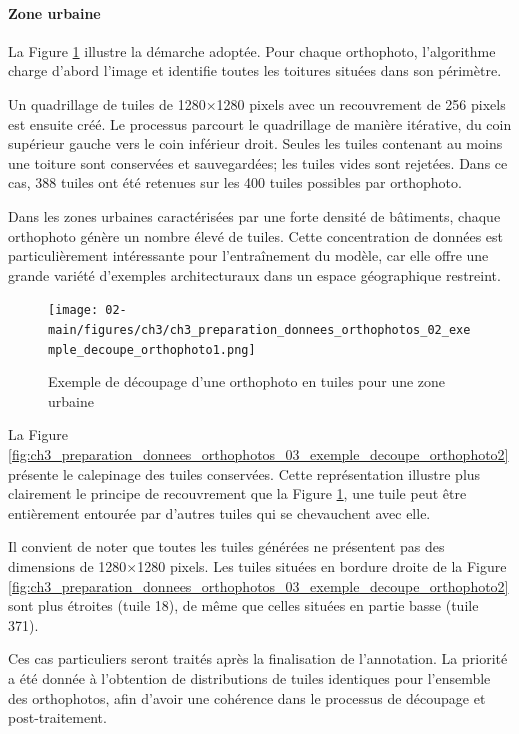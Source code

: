 \newpage
\paragraph{Zone urbaine}
La Figure \ref{fig:ch3_preparation_donnees_orthophotos_02_exemple_decoupe_orthophoto1} illustre la démarche adoptée. Pour chaque orthophoto, l'algorithme charge d'abord l'image et identifie toutes les toitures situées dans son périmètre. 

Un quadrillage de tuiles de 1280×1280 pixels avec un recouvrement de 256 pixels est ensuite créé. Le processus parcourt le quadrillage de manière itérative, du coin supérieur gauche vers le coin inférieur droit. Seules les tuiles contenant au moins une toiture sont conservées et sauvegardées; les tuiles vides sont rejetées. Dans ce cas, 388 tuiles ont été retenues sur les 400 tuiles possibles par orthophoto.

Dans les zones urbaines caractérisées par une forte densité de bâtiments, chaque orthophoto génère un nombre élevé de tuiles. Cette concentration de données est particulièrement intéressante pour l'entraînement du modèle, car elle offre une grande variété d'exemples architecturaux dans un espace géographique restreint.

\begin{figure}[H]
    \centering
    \texttt{[image: 02-main/figures/ch3/ch3\_preparation\_donnees\_orthophotos\_02\_exemple\_decoupe\_orthophoto1.png]}
    \caption{Exemple de découpage d'une orthophoto en tuiles pour une zone urbaine}
    \label{fig:ch3_preparation_donnees_orthophotos_02_exemple_decoupe_orthophoto1}
\end{figure}

\newpage
La Figure \ref{fig:ch3_preparation_donnees_orthophotos_03_exemple_decoupe_orthophoto2} présente le calepinage des tuiles conservées. Cette représentation illustre plus clairement le principe de recouvrement que la Figure \ref{fig:ch3_preparation_donnees_orthophotos_02_exemple_decoupe_orthophoto1}, une tuile peut être entièrement entourée par d'autres tuiles qui se chevauchent avec elle.

Il convient de noter que toutes les tuiles générées ne présentent pas des dimensions de 1280×1280 pixels. Les tuiles situées en bordure droite de la Figure \ref{fig:ch3_preparation_donnees_orthophotos_03_exemple_decoupe_orthophoto2} sont plus étroites (tuile 18), de même que celles situées en partie basse (tuile 371).

Ces cas particuliers seront traités après la finalisation de l'annotation. La priorité a été donnée à l'obtention de distributions de tuiles identiques pour l'ensemble des orthophotos, afin d'avoir une cohérence dans le processus de découpage et post-traitement.

